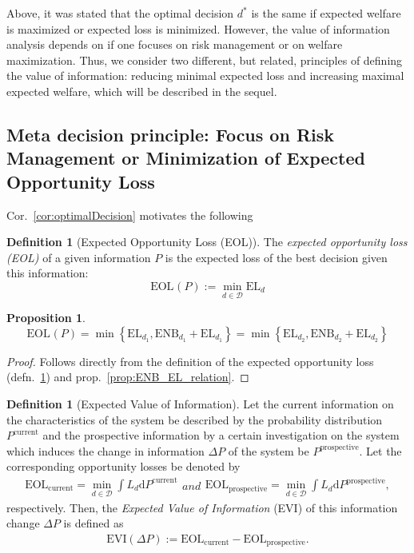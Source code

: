 \documentclass[a4paper,10pt,twoside,pagesize,abstracton]{scrartcl}
\renewcommand{\d}{\mathrm{d}\!} %
\newcommand{\EL}{\mathrm{EL}} %
\newcommand{\ENB}{\mathrm{ENB}} %
\newcommand{\EOL}[1][]{\mathrm{EOL}_{#1}} %
\newcommand{\EVI}{\mathrm{EVI}} %
\theoremstyle{plain}%
\newtheorem{prop}[thm]{Proposition}
\theoremstyle{definition}
\newtheorem{defn}[thm]{Definition}
\theoremstyle{remark}
\begin{document}
Above, it was stated that the optimal decision $d^*$ is the same if expected welfare is maximized or expected loss is minimized. However, the value of information analysis depends on if one focuses on risk management or on welfare maximization. Thus, we consider two different, but related, principles of defining the value of information: reducing minimal expected loss and increasing maximal expected welfare, which will be described in the sequel.

\subsection{Meta decision principle: Focus on Risk Management or Minimization of Expected Opportunity Loss}
Cor.~\ref{cor:optimalDecision} motivates the following 
\begin{defn}[Expected Opportunity Loss (EOL)]
  \label{defn:EOL}
  The \emph{expected opportunity loss (EOL)} of a given information $P$ is the expected loss of the best decision given this information:
  \begin{equation}
   \EOL(P) := \min_{d\in\mathcal{D}} \EL_d
 \end{equation}
\end{defn}
\begin{prop}
 \begin{equation}
  \EOL(P) = \min \left\{ \EL_{d_1}, \ENB_{d_1} + \EL_{d_1} \right\}
	  = \min \left\{ \EL_{d_2}, \ENB_{d_2} + \EL_{d_2} \right\}
 \end{equation}
\end{prop}
\begin{proof}
 Follows directly from the definition of the expected opportunity loss (defn.~\ref{defn:EOL}) and prop.~\ref{prop:ENB_EL_relation}.
\end{proof}
\begin{defn}[Expected Value of Information]
Let the current information on the characteristics of the system be described by the probability distribution $P^\mathrm{current}$ and the prospective information by a certain investigation on the system which induces the change in information $\Delta P$ of the system be $P^\mathrm{prospective}$. Let the corresponding opportunity losses be denoted by
\begin{subequations}
 \begin{align}
  \EOL[\mathrm{current}] = \min_{d\in\mathcal{D}} \int L_d \d P^\mathrm{current}
 \end{align}
 and
  \begin{align}
  \EOL[\mathrm{prospective}] = \min_{d\in\mathcal{D}} \int L_d \d P^\mathrm{prospective},
 \end{align}
\end{subequations}
respectively. Then, the \emph{Expected Value of Information} (EVI) of this information change $\Delta P$ is defined as
\begin{align}
 \EVI \left(\Delta P \right) := \EOL[\mathrm{current}] - \EOL[\mathrm{prospective}].
\end{align}
\end{defn}
\end{document}
